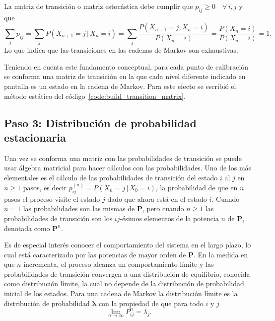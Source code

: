 La matriz de transición o matriz estocástica debe cumplir que $p_{ij} \ge 0 \quad \forall\,i,j$ y que
%
\begin{equation*}
    \sum_j p_{ij} = \sum_j P\left(X_{n + 1} = j\,|\,X_n = i\right)
    = \sum_j \frac{P\left(X_{n + 1} = j, X_n = i\right)}{P\left(X_n = i\right)}
    = \frac{P\left(X_n = i\right)}{P\left(X_n = i\right)} = 1.
\end{equation*}
%
Lo que indica que las transiciones en las cadenas de Markov son exhaustivas.

Teniendo en cuenta este fundamento conceptual, para cada punto de calibración se conforma una matriz de transición en la que cada nivel diferente indicado en pantalla es un estado en la cadena de Markov.
Para este efecto se escribió el método estático del código~\ref{code:build_transition_matrix}.

\subsection*{Paso 3: Distribución de probabilidad estacionaria}
\label{subsec:stationary_distribution}
Una vez se conforma una matriz con las probabilidades de transición se puede usar álgebra matricial para hacer cálculos con las probabilidades.
Uno de los más elementales es el cálculo de las probabilidades de transición del estado $i$ al $j$ en $n \ge 1$ pasos, es decir $p_{ij}^{(n)} = P\left(X_n = j \,|\,X_0 = i\right)$, la probabilidad de que en $n$ pasos el proceso visite el estado $j$ dado que ahora está en el estado $i$.
Cuando $n = 1$ las probabilidades son las mismas de $\mathbf{P}$, pero cuando $n \ge 1$ las probabilidades de transición son los $ij$-ésimos elementos de la potencia $n$ de $\mathbf{P}$, denotada como $\mathbf{P}^n$.

Es de especial interés conocer el comportamiento del sistema en el largo plazo, lo cual está caracterizado por las potencias de mayor orden de $\mathbf{P}$.
En la medida en que $n$ incrementa, el proceso alcanza un comportamiento límite y las probabilidades de transición convergen a una distribución de equilibrio, conocida como distribución límite, la cual no depende de la distribución de probabilidad inicial de los estados.
Para una cadena de Markov la distribución límite es la distribución de probabilidad $\boldsymbol{\lambda}$ con la propiedad de que para todo $i$ y $j$
%
\begin{equation}
    \lim_{n\to\infty} P_{ij}^n = \lambda_{j}.
\end{equation}

